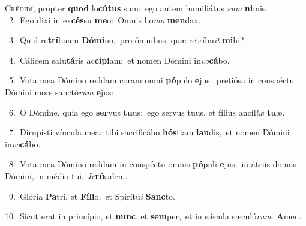 \lettrine{\initial\textcolor{\initialcolor}{C}}{rédidi,} propter \textbf{quod} lo\-\textbf{cú}\-\textbf{tus} sum:~\star ego autem humiliátus \textit{sum} \textbf{ni}\-mis.\\
{\numbfont\textcolor{\numbcolor}{~2.}}~Ego dixi in ex\-\textbf{cés}\-su \textbf{me}\-o:~\star Omnis ho\textit{mo} \textbf{men}\-dax.\par
{\numbfont\textcolor{\numbcolor}{~3.}}~Quid re\-\textbf{trí}\-buam \textbf{Dó}\-\textbf{mi}no,~\star pro ómnibus, quæ retríbu\textit{it} \textbf{mi}\-hi?\par
{\numbfont\textcolor{\numbcolor}{~4.}}~Cálicem salu\-\textbf{tá}\-ris ac\-\textbf{cí}\-\textbf{pi}am:~\star et nomen Dómini in\-\textit{vo}\-\textbf{cá}bo.\par
{\numbfont\textcolor{\numbcolor}{~5.}}~Vota mea Dómino reddam coram omni \textbf{pó}\-pulo \textbf{e}\-jus:~\star pretiósa in conspéctu Dómini mors sanctó\textit{rum} \textbf{e}\-jus:\par
{\numbfont\textcolor{\numbcolor}{~6.}}~O Dómine, quia ego \textbf{ser}\-vus \textbf{tu}\-us:~\star ego servus tuus, et fílius ancíl\textit{læ} \textbf{tu}\-æ.\par
{\numbfont\textcolor{\numbcolor}{~7.}}~Dirupísti víncula mea:~\dagger tibi sacrificábo \textbf{hós}\-tiam \textbf{lau}\-dis,~\star et nomen Dómini in\-\textit{vo}\-\textbf{cá}bo.\par
{\numbfont\textcolor{\numbcolor}{~8.}}~Vota mea Dómino reddam in conspéctu omnis \textbf{pó}\-puli \textbf{e}\-jus:~\star in átriis domus Dómini, in médio tui, \textit{Je}\-\textbf{rú}salem.\par
{\numbfont\textcolor{\numbcolor}{~9.}}~Glória \textbf{Pa}\-tri, et \textbf{Fí}\-\textbf{li}o,~\star et Spirítu\textit{i} \textbf{Sanc}\-to.\par
{\numbfont\textcolor{\numbcolor}{10.}}~Sicut erat in princípio, et \textbf{nunc}\-, et \textbf{sem}\-per,~\star et in sǽcula sæculó\-\textit{rum}\-. \textbf{A}\-men.\par
